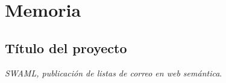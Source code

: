 
\chapter{Memoria}

\section{Título del proyecto}

\emph{SWAML, publicación de listas de correo en web semántica}.







\newpage



